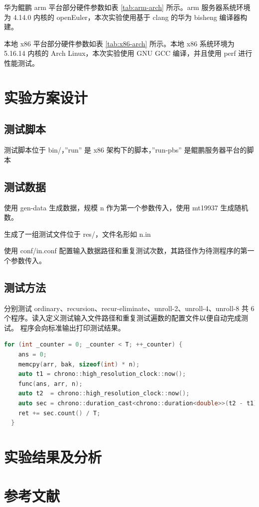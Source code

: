 \documentclass[a4paper]{article}
\begin{document}
华为鲲鹏 arm 平台部分硬件参数如表 \ref{tab:arm-arch} 所示。arm 服务器系统环境为 4.14.0 内核的 openEuler，本次实验使用基于 clang 的华为 bisheng 编译器构建。

本地 x86 平台部分硬件参数如表 \ref{tab:x86-arch} 所示。本地 x86 系统环境为 5.16.14 内核的 Arch Linux，本次实验使用 GNU GCC 编译，并且使用 perf 进行性能测试。

\section{实验方案设计}
\subsection{测试脚本}
测试脚本位于 bin/，''run'' 是 x86 架构下的脚本，''run-pbs'' 是鲲鹏服务器平台的脚本

\subsection{测试数据}
使用 gen-data 生成数据，规模 n 作为第一个参数传入，使用 mt19937 生成随机数。

生成了一组测试文件位于 res/，文件名形如 n.in

使用 conf/in.conf 配置输入数据路径和重复测试次数，其路径作为待测程序的第一个参数传入。

\subsection{测试方法}
分别测试 ordinary、recursion、recur-eliminate、unroll-2、unroll-4、unroll-8 共 6 个程序。读入定义测试输入文件路径和重复测试遍数的配置文件以便自动完成测试。
程序会向标准输出打印测试结果。

\begin{lstlisting}[title=重复测试代码,frame=trbl,language={C++}]
  for (int _counter = 0; _counter < T; ++_counter) {
    ans = 0;
    memcpy(arr, bak, sizeof(int) * n);
    auto t1 = chrono::high_resolution_clock::now();
    func(ans, arr, n);
    auto t2  = chrono::high_resolution_clock::now();
    auto sec = chrono::duration_cast<chrono::duration<double>>(t2 - t1);
    ret += sec.count() / T;
  }
\end{lstlisting}

\section{实验结果及分析}

\newpage

\section{参考文献}
\cite{1}\cite{2}\cite{3}\cite{4}\cite{5}\cite{6}



\end{document}
